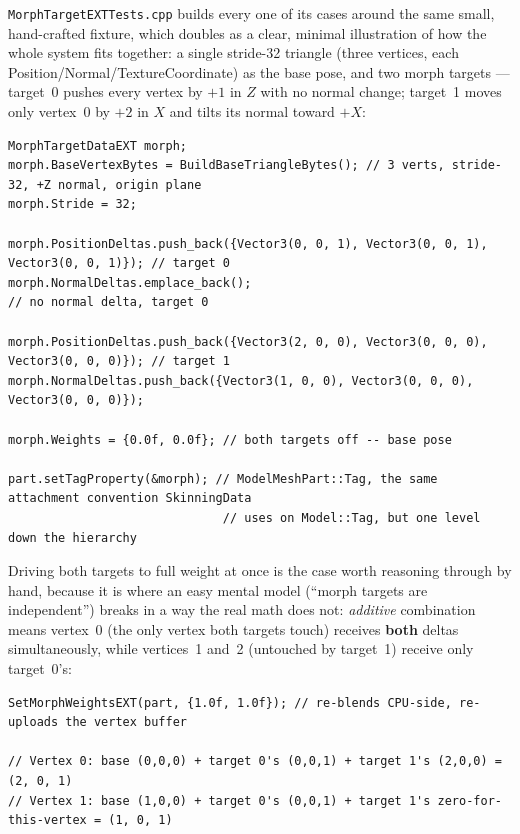 \texttt{MorphTargetEXTTests.cpp} builds every one of its cases around the same small,
hand-crafted fixture, which doubles as a clear, minimal illustration of how the whole system
fits together: a single stride-32 triangle (three vertices, each Position/Normal/TextureCoordinate)
as the base pose, and two morph targets --- target~0 pushes every vertex by $+1$ in $Z$ with no
normal change; target~1 moves only vertex~0 by $+2$ in $X$ and tilts its normal toward $+X$:

\begin{lstlisting}
MorphTargetDataEXT morph;
morph.BaseVertexBytes = BuildBaseTriangleBytes(); // 3 verts, stride-32, +Z normal, origin plane
morph.Stride = 32;

morph.PositionDeltas.push_back({Vector3(0, 0, 1), Vector3(0, 0, 1), Vector3(0, 0, 1)}); // target 0
morph.NormalDeltas.emplace_back();                                    // no normal delta, target 0

morph.PositionDeltas.push_back({Vector3(2, 0, 0), Vector3(0, 0, 0), Vector3(0, 0, 0)}); // target 1
morph.NormalDeltas.push_back({Vector3(1, 0, 0), Vector3(0, 0, 0), Vector3(0, 0, 0)});

morph.Weights = {0.0f, 0.0f}; // both targets off -- base pose

part.setTagProperty(&morph); // ModelMeshPart::Tag, the same attachment convention SkinningData
                              // uses on Model::Tag, but one level down the hierarchy
\end{lstlisting}

Driving both targets to full weight at once is the case worth reasoning through by hand, because
it is where an easy mental model (``morph targets are independent'') breaks in a way the real
math does not: \emph{additive} combination means vertex~0 (the only vertex both targets touch)
receives \textbf{both} deltas simultaneously, while vertices~1 and~2 (untouched by target~1)
receive only target~0's:

\begin{lstlisting}
SetMorphWeightsEXT(part, {1.0f, 1.0f}); // re-blends CPU-side, re-uploads the vertex buffer

// Vertex 0: base (0,0,0) + target 0's (0,0,1) + target 1's (2,0,0) = (2, 0, 1)
// Vertex 1: base (1,0,0) + target 0's (0,0,1) + target 1's zero-for-this-vertex = (1, 0, 1)
\end{lstlisting}

